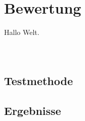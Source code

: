 
\chapter{Bewertung}%
\label{sec:evaluation}

Hallo Welt.

\inputminted{cypher}{data/evaluation/people.cql}
\inputminted{cypher}{data/evaluation/personTimeAction.cql}
\inputminted{cypher}{data/evaluation/personNegationAction.cql}

\section{Testmethode}%
\label{sec:evaluation:methodology}

\section{Ergebnisse}%
\label{sec:evaluation:results}
